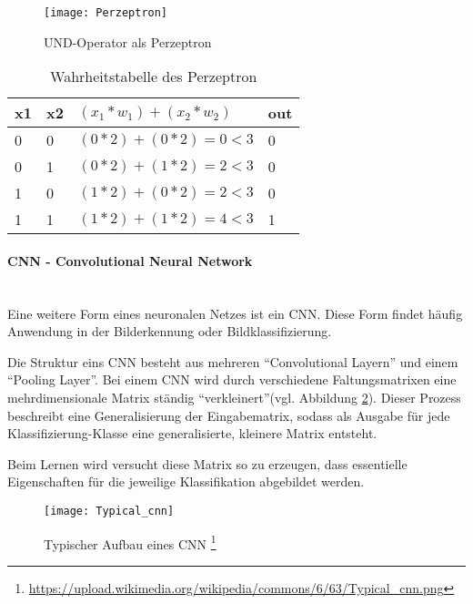    \begin{figure}[H]
        \centering
        \texttt{[image: Perzeptron]}
        \caption{UND-Operator als Perzeptron \cite{DrawIO}}
        \label{fig:PerzeptronAND}
    \end{figure}

    \begin{table}[H]
        \centering
        \begin{tabular}{|l|l|l|l|}
            \hline
            x1 & x2 & \( (x_1 * w_1) + (x_2 * w_2) \) & out \\
            \hline
            0 & 0 & \( (0 * 2) + (0 * 2) = 0 < 3 \) & 0 \\
            \hline
            0 & 1 & \( (0 * 2) + (1 * 2) = 2 < 3 \) & 0 \\
            \hline
            1 & 0 & \( (1 * 2) + (0 * 2) = 2 < 3 \) & 0 \\
            \hline
            1 & 1 & \( (1 * 2) + (1 * 2) = 4 < 3 \) & 1 \\
            \hline
        \end{tabular}
        \caption{Wahrheitstabelle des Perzeptron}
        \label{tabl:Perzeptron}
    \end{table}

    \paragraph{CNN - Convolutional Neural Network}
    \cite[Vgl. im Folgenden]{Robotics2}\\
    Eine weitere Form eines neuronalen Netzes ist ein \ac{CNN}.
    Diese Form findet häufig Anwendung in der Bilderkennung oder Bildklassifizierung.
    \newline

    Die Struktur eins \ac{CNN} besteht aus mehreren "`Convolutional Layern"' und einem "`Pooling Layer"'.
    Bei einem \ac{CNN} wird durch verschiedene Faltungsmatrixen eine mehrdimensionale Matrix ständig "`verkleinert"'(vgl. Abbildung \ref{fig:Typisch_CNN}).
    Dieser Prozess beschreibt eine Generalisierung der Eingabematrix, sodass als Ausgabe für jede Klassifizierung-Klasse eine generalisierte, kleinere Matrix entsteht.
    
    Beim Lernen wird versucht diese Matrix so zu erzeugen, dass essentielle Eigenschaften für die jeweilige Klassifikation abgebildet werden.

    \begin{figure}[H]
        \centering
        \texttt{[image: Typical\_cnn]}
        \caption[Typischer Aufbau eines CNN]{Typischer Aufbau eines \ac{CNN} \footnote{\url{https://upload.wikimedia.org/wikipedia/commons/6/63/Typical_cnn.png}} }
        \label{fig:Typisch_CNN}
    \end{figure}



